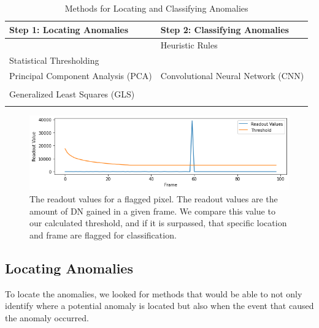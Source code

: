 \begin{table}
    \centering
    \begin{tabular}{|l|l|}
            \hline
        \textbf{Step 1: Locating Anomalies} & \textbf{Step 2: Classifying Anomalies} \\
                \hline
        & Heuristic Rules \\
        Statistical Thresholding& \parencite{cillis2018snowballs} \\
        \hline
        Principal Component Analysis (PCA) & Convolutional Neural Network (CNN)\\
        \parencite{cillis2018snowballs} & \parencite{gu2018recent} \\
        \hline
        Generalized Least Squares (GLS) & \\
        \parencite{robberto2015cr} & \\
        \hline
    \end{tabular}
    \caption{Methods for Locating and Classifying Anomalies}
    \label{rst/tab:methods}
\end{table}


\begin{figure}[b]
    \centering
    \includegraphics[width=1\linewidth]{figs/rst/Threshold.png}
    \caption[Readout Values Throughout a WFI Detector's Integration]{The readout values for a flagged pixel. The readout values are the amount of DN gained in a given frame. We compare this value to our calculated threshold, and if it is surpassed, that specific location and frame are flagged for classification.}
    \label{rst/fig:threshold}
\end{figure}
\subsection{Locating Anomalies}
To locate the anomalies, we looked for methods that would be able to not only identify where a potential anomaly is located but also when the event that caused the anomaly occurred. 
